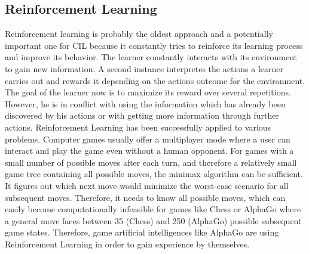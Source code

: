 \documentclass[conference]{IEEEtran}
\newcommand\notes[1]{\textcolor{red}{#1}}
\begin{document}
\subsection{Reinforcement Learning}\label{reinforcement}
Reinforcement learning is probably the oldest approach and a potentially important one for CIL because 
it constantly tries to reinforce its learning process and improve its behavior. 
The learner constantly interacts with its environment to gain new information. A second instance interpretes the 
actions a learner carries out and rewards it depending on the actions outcome for the environment. The goal of 
the learner now is to maximize its reward over several repetitions. 
However, he is in conflict with using the information which has already been discovered by his actions 
or with getting more information through further actions. Reinforcement Learning has been successfully 
applied to various problems. 
Computer games usually offer a multiplayer mode where a user can interact and 
play the game even without a human opponent. For games with a small number of 
possible moves after each turn, and therefore a relatively small game tree containing 
all possible moves, the minimax algorithm\cite{Prog2:bachmaier} can be sufficient. 
It figures out which next move would minimize the worst-case scenario for all subsequent 
moves. Therefore, it needs to know all possible moves, which can easily become computationally 
infeasible for games like Chess or AlphaGo where a general move faces between 35 (Chess) and 
250 (AlphaGo) possible subsequent game states. 
Therefore, game artificial intelligences like AlphaGo are using Reinforcement Learning in order to gain 
experience by themselves\cite{Alpha:silver}.

\end{document}
